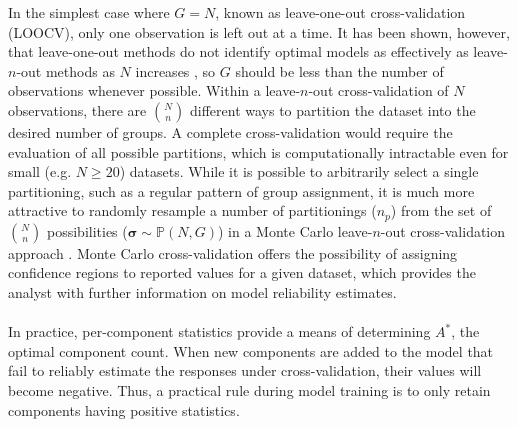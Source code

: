 \begin{doublespace}
In the simplest case where $G = N$, known as leave-one-out cross-validation
(LOOCV), only one observation is left out at a time. It has been shown,
however, that leave-one-out methods do not identify optimal models as
effectively as leave-$n$-out methods as $N$ increases \cite{shao:jasa1993},
so $G$ should be less than the number of observations whenever possible.
Within a leave-$n$-out cross-validation of $N$ observations, there are
$\binom{N}{n}$ different ways to partition the dataset into the desired
number of groups. A complete cross-validation would require the evaluation
of all possible partitions, which is computationally intractable even for
small (e.g. $N \ge 20$) datasets. While it is possible to arbitrarily select
a single partitioning, such as a regular pattern of group assignment, it is
much more attractive to randomly resample a number of partitionings ($n_p$)
from the set of $\binom{N}{n}$ possibilities
($\boldsymbol{\sigma} \sim \mathbb{P}(N,G)$) in a
Monte Carlo leave-$n$-out cross-validation approach \cite{xu:cils2001}. Monte
Carlo cross-validation offers the possibility of assigning confidence regions
to reported \qsq{} values for a given dataset, which provides the analyst with
further information on model reliability estimates.
\\\\
In practice, per-component \qsq{} statistics provide a means of determining
$A^\ast$, the optimal component count. When new components are added to the
model that fail to reliably estimate the responses under cross-validation,
their \qsq{} values will become negative. Thus, a practical rule during model
training is to only retain components having positive \qsq{} statistics.
\end{doublespace}

